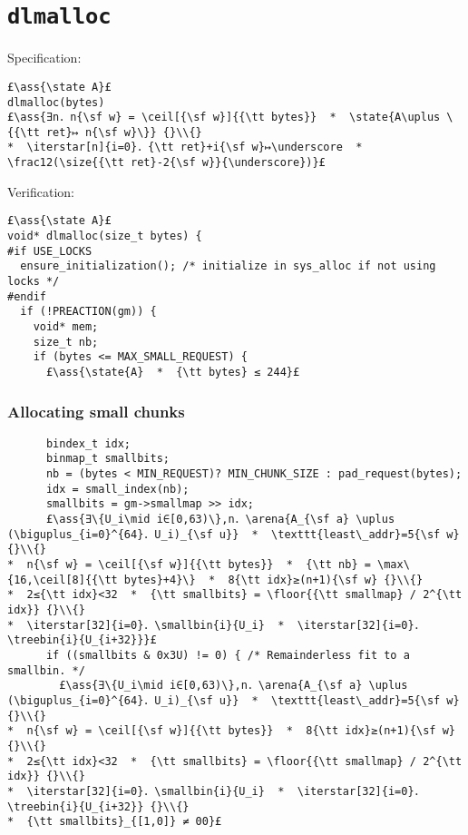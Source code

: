 \documentclass[10pt,a4paper,twoside]{report}
\makeatletter
\newcommand{\ml}[2][t]{\mbox{\mdseries\begin{tabular}[#1]{@{}L@{}}#2\end{tabular}}}
\newcommand{\ass}[1]{\ensuremath{{\color{blue}\left\{\ml[c]{#1}\right\}}}}
\renewcommand{\floor}[2][]{\left\lfloor{#2}\right\rfloor_{#1}}
\renewcommand{\ceil}[2][]{\left\lceil{#2}\right\rceil_{#1}}
\newcommand{\iterstar}[2][]{\text{\LARGE $*$}^{#1}_{#2}}
\makeatother
\begin{document}
\chapter{{\tt dlmalloc}}

Specification:
\begin{lstlisting}
£\ass{\state A}£
dlmalloc(bytes)
£\ass{∃n．n{\sf w} = \ceil[{\sf w}]{{\tt bytes}}  *  \state{A\uplus \{{\tt ret}↦ n{\sf w}\}} {}\\{} 
*  \iterstar[n]{i=0}．{\tt ret}+i{\sf w}↦\underscore  *  \frac12(\size{{\tt ret}-2{\sf w}}{\underscore})}£
\end{lstlisting}

\noindent Verification:


\setcounter{lstnumber}{0}
\begin{lstlisting}
£\ass{\state A}£
void* dlmalloc(size_t bytes) {
#if USE_LOCKS
  ensure_initialization(); /* initialize in sys_alloc if not using locks */
#endif
  if (!PREACTION(gm)) {
    void* mem;
    size_t nb;
    if (bytes <= MAX_SMALL_REQUEST) {
      £\ass{\state{A}  *  {\tt bytes} ≤ 244}£
\end{lstlisting}

\subsection*{Allocating small chunks}\label{sect:allocating_small_chunks}
\begin{lstlisting}
      bindex_t idx;
      binmap_t smallbits;
      nb = (bytes < MIN_REQUEST)? MIN_CHUNK_SIZE : pad_request(bytes);    
      idx = small_index(nb);
      smallbits = gm->smallmap >> idx;
      £\ass{∃\{U_i\mid i∈[0,63)\},n．\arena{A_{\sf a} \uplus (\biguplus_{i=0}^{64}．U_i)_{\sf u}}  *  \texttt{least\_addr}=5{\sf w} {}\\{}
*  n{\sf w} = \ceil[{\sf w}]{{\tt bytes}}  *  {\tt nb} = \max\{16,\ceil[8]{{\tt bytes}+4}\}  *  8{\tt idx}≥(n+1){\sf w} {}\\{}
*  2≤{\tt idx}<32  *  {\tt smallbits} = \floor{{\tt smallmap} / 2^{\tt idx}} {}\\{}
*  \iterstar[32]{i=0}．\smallbin{i}{U_i}  *  \iterstar[32]{i=0}．\treebin{i}{U_{i+32}}}£
      if ((smallbits & 0x3U) != 0) { /* Remainderless fit to a smallbin. */
        £\ass{∃\{U_i\mid i∈[0,63)\},n．\arena{A_{\sf a} \uplus (\biguplus_{i=0}^{64}．U_i)_{\sf u}}  *  \texttt{least\_addr}=5{\sf w} {}\\{}
*  n{\sf w} = \ceil[{\sf w}]{{\tt bytes}}  *  8{\tt idx}≥(n+1){\sf w} {}\\{}
*  2≤{\tt idx}<32  *  {\tt smallbits} = \floor{{\tt smallmap} / 2^{\tt idx}} {}\\{}
*  \iterstar[32]{i=0}．\smallbin{i}{U_i}  *  \iterstar[32]{i=0}．\treebin{i}{U_{i+32}} {}\\{}
*  {\tt smallbits}_{[1,0]} ≠ 00}£
\end{lstlisting}
\end{document}
